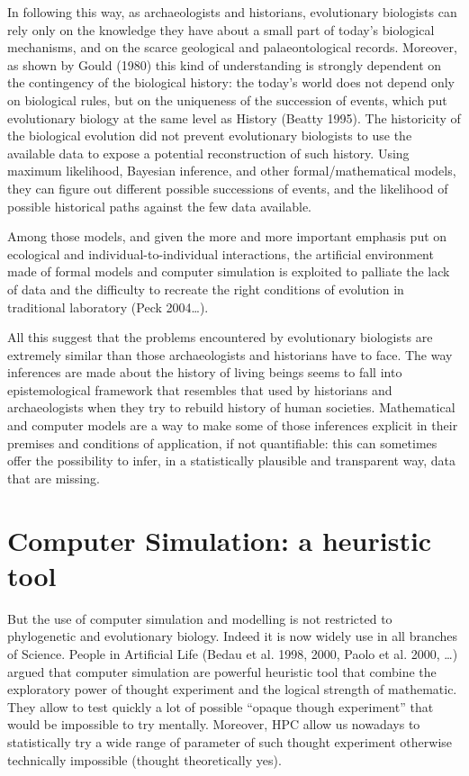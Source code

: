 \documentclass[a4paper]{article}
\begin{document}
In following this way, as archaeologists and historians, evolutionary biologists can rely only on the knowledge they have about a small part of today's biological mechanisms, and on the scarce geological and palaeontological records.  Moreover, as shown by Gould (1980) this kind of understanding is strongly dependent on the contingency of the biological history: the today's world does not depend only on biological rules, but on the uniqueness of the succession of events, which put evolutionary biology at the same level as History (Beatty 1995).  The historicity of the biological evolution did not prevent evolutionary biologists to use the available data to expose a potential reconstruction of such history. Using maximum likelihood, Bayesian inference, and other formal/mathematical models, they can figure out different possible successions of events, and the likelihood of possible historical paths against the few data available.

Among those models, and given the more and more important emphasis put on ecological and individual-to-individual interactions, the artificial environment made of formal models and computer simulation is exploited to palliate the lack of data and the difficulty to recreate the right conditions of evolution in traditional laboratory (Peck 2004\ldots).

All this suggest that the problems encountered by evolutionary biologists are extremely similar than those archaeologists and historians have to face. The way inferences are made about the history of living beings seems to fall into epistemological framework that resembles that used by historians and archaeologists when they try to rebuild history of human societies. Mathematical and computer models are a way to make some of those inferences explicit in their premises and conditions of application, if not quantifiable: this can sometimes offer the possibility to infer, in a statistically plausible and transparent way, data that are missing.

\section{Computer Simulation: a heuristic tool}
But the use of computer simulation and modelling is not restricted to phylogenetic and evolutionary biology. Indeed it is now widely use in all branches of Science. People in Artificial Life (Bedau et al. 1998, 2000, Paolo et al. 2000, \ldots) argued that computer simulation are powerful heuristic tool that combine the exploratory power of thought experiment and the logical strength of mathematic. They allow to test quickly a lot of possible ``opaque though experiment'' that would be impossible to try mentally.
Moreover, HPC allow us nowadays to statistically try a wide range of parameter of such thought experiment otherwise technically impossible (thought theoretically yes).
\end{document}

